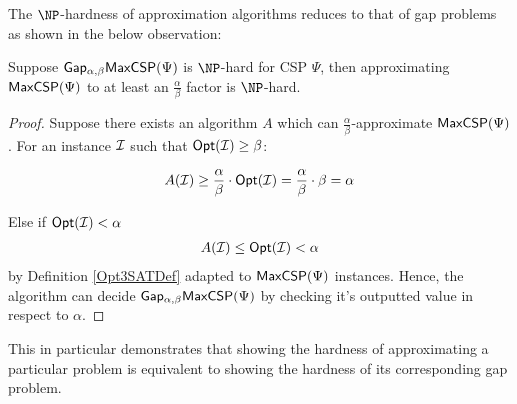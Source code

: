 The $\NP$-hardness of approximation algorithms reduces to that of gap problems as shown in the below observation:

\begin{theorem} \label{GapCSPtoAlgHard}
Suppose $\mathsf{Gap_{\alpha,\beta}}\mathsf{MaxCSP}(\Psi)$ is $\NP$-hard for CSP $\Psi$, then approximating $\mathsf{MaxCSP}(\Psi)$ to at least an $\frac{\alpha}{\beta}$ factor is $\NP$-hard.
\end{theorem}
%
\begin{proof}
Suppose there exists an algorithm $A$ which can $\frac{\alpha}{\beta}$-approximate $\mathsf{MaxCSP}(\Psi)$. For an instance $\mathcal{I}$ such that $\mathsf{Opt}(\mathcal{I}) \geq \beta$:

\begin{gather*}
A(\mathcal{I}) \geq  \frac{\alpha}{\beta} \cdot \mathsf{Opt}(\mathcal{I}) = \frac{\alpha}{\beta} \cdot \beta =  \alpha \\
\end{gather*}

Else if $\mathsf{Opt}(\mathcal{I}) < \alpha$
\begin{gather*}
A(\mathcal{I}) \leq \mathsf{Opt}(\mathcal{I}) < \alpha
\end{gather*}
by Definition \ref{Opt3SATDef} adapted to $\mathsf{MaxCSP}(\Psi)$ instances. Hence, the algorithm can decide  $\mathsf{Gap_{\alpha,\beta}}\mathsf{MaxCSP}(\Psi)$ by checking it's outputted value in respect to $\alpha$.
\end{proof}
%
This in particular demonstrates that showing the hardness of approximating a particular problem is equivalent to showing the hardness of its corresponding gap problem.



